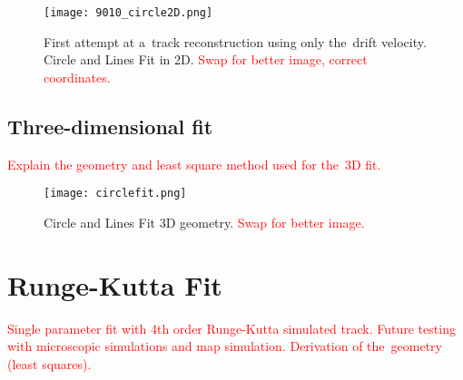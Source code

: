 			\begin{figure}
				\centering
				\texttt{[image: 9010\_circle2D.png]}
				\caption{First attempt at a~track reconstruction using only the~drift velocity. Circle and Lines Fit in 2D. \textcolor{red}{Swap for better image, correct coordinates.}}
				\label{fig:9010circle2D}
			\end{figure}
		
		\subsection{Three-dimensional fit}
			\textcolor{red}{Explain the geometry and least square method used for the~3D fit.}
			
			\begin{figure}
				\centering
				\texttt{[image: circlefit.png]}
				\caption{Circle and Lines Fit 3D geometry. \textcolor{red}{Swap for better image.}}
				\label{fig:circlefit}
			\end{figure}
	
	\section{Runge-Kutta Fit}
		\textcolor{red}{Single parameter fit with 4th order Runge-Kutta simulated track. Future testing with microscopic simulations and map simulation. Derivation of the~geometry (least squares).}